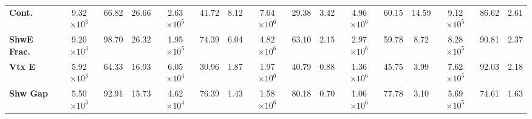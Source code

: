 \begin{landscape}
\begin{table}[!hb]
\begin{tabular}{|l|ccc|ccc|ccc|ccc|ccc|}
\textbf{Cont.}  & 9.32$\times 10^3$           & 66.82                                                               & 26.66                                      & 2.63$\times 10^5$             & 41.72                                                                 & 8.12                                         & 7.64$\times 10^6$              & 29.38                                                                  & 3.42                                          & 4.96$\times 10^6$          & 60.15                                                              & 14.59                                     & 9.12$\times 10^5$             & 86.62                                                                 & 2.61                                         \\
\textbf{ShwE Frac.}  & 9.20$\times 10^3$           & 98.70                                                               & 26.32                                      & 1.95$\times 10^5$             & 74.39                                                                 & 6.04                                         & 4.82$\times 10^6$              & 63.10                                                                  & 2.15                                          & 2.97$\times 10^6$          & 59.78                                                              & 8.72                                      & 8.28$\times 10^5$             & 90.81                                                                 & 2.37                                         \\
\textbf{Vtx E}         & 5.92$\times 10^3$           & 64.33                                                               & 16.93                                      & 6.05$\times 10^4$             & 30.96                                                                 & 1.87                                         & 1.97$\times 10^6$ & 40.79                                                                  & 0.88                                          & 1.36$\times 10^6$          & 45.75                                                              & 3.99                                      & 7.62$\times 10^5$             & 92.03                                                                 & 2.18                                         \\
\textbf{Shw Gap}          & 5.50$\times 10^3$           & 92.91                                                               & 15.73                                      & 4.62$\times 10^4$             & 76.39                                                                 & 1.43                                         & 1.58$\times 10^6$ & 80.18                                                                  & 0.70                                          & 1.06$\times 10^6$          & 77.78                                                              & 3.10                                      & 5.69$\times 10^5$             & 74.61                                                                 & 1.63                                         \\

\end{tabular}
\end{table}
\end{landscape}
